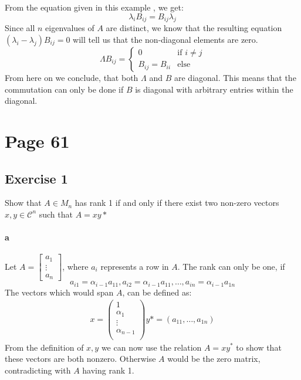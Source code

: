  From the equation given in this example , we get: 
 \begin{equation*}
\lambda_i B_{ij} = B_{ij} \lambda_j 
 \end{equation*}
 Since all $n$ eigenvalues of $A$ are distinct, we know that the resulting equation $(\lambda_i -\lambda_j) B_{ij} = 0$ will tell us that the non-diagonal elements are zero.
 \begin{equation*}
 \Lambda B_{ij} = \begin{cases}
 0 & \mbox{if } i \neq j \\
 B_{ij} = B_{ii} & \mbox{else } 
 \end{cases} 
 \end{equation*}
 From here on we conclude, that both $\Lambda$ and $B$ are diagonal. This means that the commutation can only be done if $B$ is diagonal with arbitrary entries within the diagonal.

\section{Page 61}
\subsection{Exercise 1}
Show that $A \in M_n$ has rank 1 if and only if there exist two non-zero vectors $x,y \in \mathcal{C}^n$ such that $A = xy*$
\paragraph{a}
Let $A = \left[ \begin{array}{c}
 a_1 \\ 
 \vdots \\
 a_n
\end{array} \right]$, where $a_i$ represents a row in $A$.
The rank can only be one, if 
\begin{equation*}
a_{i1} =  \alpha_{i-1} a_{11},a_{i2} = \alpha_{i-1} a_{11}, \ldots, a_{in} = \alpha_{i-1} a_{1n}
\end{equation*}
The vectors which would span $A$, can be defined as:
\begin{gather*}
x = \left( \begin{array}{c}
1 \\
\alpha_1 \\
\vdots \\
\alpha_{n-1} \\
\end{array} \right)
y* = \left( a_{11}, \ldots , a_{1n} \right)
\end{gather*}
From the definition of $x,y$ we can now use the relation $A = xy^*$ to show that these vectors are both nonzero. Otherwise $A$ would be the zero matrix, contradicting with $A$ having rank 1.

